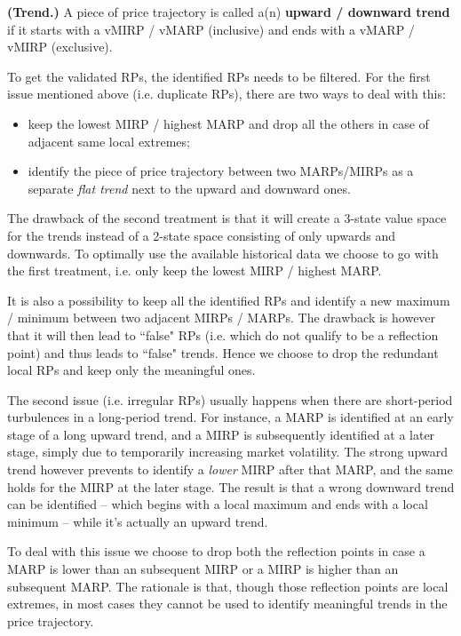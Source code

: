 \begin{definition}
	\textbf{(Trend.)} A piece of price trajectory is called a(n) \textbf{upward / downward trend} if it starts with a vMIRP / vMARP (inclusive) and ends with a vMARP / vMIRP (exclusive). 
\end{definition}

To get the validated RPs, the identified RPs needs to be filtered. For the first issue mentioned above (i.e. duplicate RPs), there are two ways to deal with this: 
\begin{itemize}
	\item keep the lowest MIRP / highest MARP and drop all the others in case of adjacent same local extremes; 
	\item identify the piece of price trajectory between two MARPs/MIRPs as a separate \textit{flat trend} next to the upward and downward ones.  
\end{itemize}

The drawback of the second treatment is that it will create a 3-state value space for the trends instead of a 2-state space consisting of only upwards and downwards. To optimally use the available historical data we choose to go with the first treatment, i.e. only keep the lowest MIRP / highest MARP. 

It is also a possibility to keep all the identified RPs and identify a new maximum / minimum between two adjacent MIRPs / MARPs. The drawback is however that it will then lead to ``false" RPs (i.e. which do not qualify to be a reflection point) and thus leads to ``false" trends. Hence we choose to drop the redundant local RPs and keep only the meaningful ones. 

The second issue (i.e. irregular RPs) usually happens when there are short-period turbulences in a long-period trend. For instance, a MARP is identified at an early stage of a long upward trend, and a MIRP is subsequently identified at a later stage, simply due to temporarily increasing market volatility. The strong upward trend however prevents to identify a \textit{lower} MIRP after that MARP, and the same holds for the MIRP at the later stage. The result is that a wrong downward trend can be identified -- which begins with a local maximum and ends with a local minimum -- while it's actually an upward trend. 

To deal with this issue we choose to drop both the reflection points in case a MARP is lower than an subsequent MIRP or a MIRP is higher than an subsequent MARP. The rationale is that, though those reflection points are local extremes, in most cases they cannot be used to identify meaningful trends in the price trajectory. 

